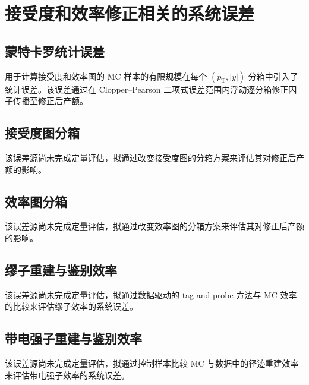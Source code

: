 \section{接受度和效率修正相关的系统误差}
\label{sec:syst-efficiency}

\subsection{蒙特卡罗统计误差}
\label{subsec:syst-mc-stat}

用于计算接受度和效率图的 MC 样本的有限规模在每个 $(p_{\mathrm T}, |y|)$ 分箱中引入了统计误差。该误差通过在 Clopper--Pearson 二项式误差范围内浮动逐分箱修正因子传播至修正后产额。

\subsection{接受度图分箱}
\label{subsec:syst-acceptance-binning}

该误差源尚未完成定量评估，拟通过改变接受度图的分箱方案来评估其对修正后产额的影响。

\subsection{效率图分箱}
\label{subsec:syst-efficiency-binning}

该误差源尚未完成定量评估，拟通过改变效率图的分箱方案来评估其对修正后产额的影响。

\subsection{缪子重建与鉴别效率}
\label{subsec:syst-muon-eff}

该误差源尚未完成定量评估，拟通过数据驱动的 tag-and-probe 方法与 MC 效率的比较来评估缪子效率的系统误差。

\subsection{带电强子重建与鉴别效率}
\label{subsec:syst-kaon-eff}

该误差源尚未完成定量评估，拟通过控制样本比较 MC 与数据中的径迹重建效率来评估带电强子效率的系统误差。

